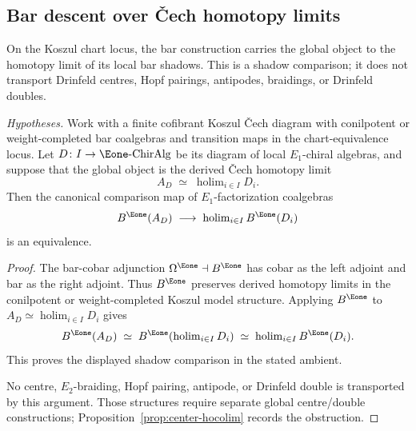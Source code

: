 \medskip

\subsection{Bar descent over \v{C}ech homotopy limits}
\label{subsec:bar-hocolim}

On the Koszul chart locus, the bar construction carries the global
object to the homotopy limit of its local bar shadows. This is a shadow
comparison; it does not transport Drinfeld centres, Hopf pairings,
antipodes, braidings, or Drinfeld doubles.

\begin{theorem}
\label{thm:bar-hocolim}
\noindent\emph{Hypotheses.} Work with a finite cofibrant Koszul
\v{C}ech diagram with conilpotent or weight-completed bar coalgebras
and transition maps in the chart-equivalence locus. Let
\(D \colon I \to \Eone\text{-}\mathrm{ChirAlg}\) be its diagram of
local \(E_1\)-chiral algebras, and suppose that the global object is
the derived \v{C}ech homotopy limit
\[
 A_D \;\simeq\; \operatorname{holim}_{i\in I} D_i .
\]
Then the canonical comparison map of \(E_1\)-factorization coalgebras
\begin{equation}
\label{eq:bar-hocolim}
 B^{\Eone}(A_D)
 \;\longrightarrow\;
 \operatorname{holim}_{i\in I} B^{\Eone}(D_i)
\end{equation}
is an equivalence.
\end{theorem}

\begin{proof}
The bar-cobar adjunction \(\Omega^{\Eone}\dashv B^{\Eone}\) has cobar
as the left adjoint and bar as the right adjoint. Thus \(B^{\Eone}\)
preserves derived homotopy limits in the conilpotent or
weight-completed Koszul model structure. Applying \(B^{\Eone}\) to
\(A_D \simeq \operatorname{holim}_{i\in I}D_i\) gives
\[
 B^{\Eone}(A_D)
 \;\simeq\;
 B^{\Eone}\!\left(\operatorname{holim}_{i\in I}D_i\right)
 \;\simeq\;
 \operatorname{holim}_{i\in I}B^{\Eone}(D_i).
\]
This proves the displayed shadow comparison in the stated ambient.

No centre, \(E_2\)-braiding, Hopf pairing, antipode, or Drinfeld double
is transported by this argument. Those structures require separate
global centre/double constructions; Proposition~\ref{prop:center-hocolim}
records the obstruction.
\end{proof}


